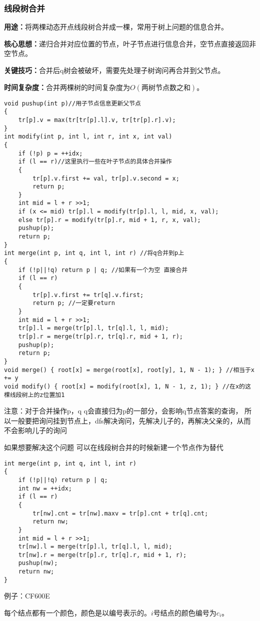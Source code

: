 \documentclass[a4paper, fontset=none]{ctexart}
\begin{document}
\subsubsection{线段树合并}
\textbf{用途：}将两棵动态开点线段树合并成一棵，常用于树上问题的信息合并。

\textbf{核心思想：}递归合并对应位置的节点，叶子节点进行信息合并，空节点直接返回非空节点。

\textbf{关键技巧：}合并后q树会被破坏，需要先处理子树询问再合并到父节点。

\textbf{时间复杂度：}合并两棵树的时间复杂度为$O(\text{两树节点数之和})$。
\begin{verbatim}
void pushup(int p)//用子节点信息更新父节点
{
    tr[p].v = max(tr[tr[p].l].v, tr[tr[p].r].v);
}
int modify(int p, int l, int r, int x, int val)
{
    if (!p) p = ++idx;
    if (l == r)//这里执行一些在叶子节点的具体合并操作
    {
        tr[p].v.first += val, tr[p].v.second = x;
        return p;
    }
    int mid = l + r >>1;
    if (x <= mid) tr[p].l = modify(tr[p].l, l, mid, x, val);
    else tr[p].r = modify(tr[p].r, mid + 1, r, x, val);
    pushup(p);
    return p;
}
int merge(int p, int q, int l, int r) //将q合并到p上
{
    if (!p||!q) return p | q; //如果有一个为空 直接合并
    if (l == r)
    {
        tr[p].v.first += tr[q].v.first;
        return p; //一定要return
    }
    int mid = l + r >>1;
    tr[p].l = merge(tr[p].l, tr[q].l, l, mid);
    tr[p].r = merge(tr[p].r, tr[q].r, mid + 1, r);
    pushup(p);
    return p;
}
void merge() { root[x] = merge(root[x], root[y], 1, N - 1); } //相当于x += y
void modify() { root[x] = modify(root[x], 1, N - 1, z, 1); } //在x的这棵线段树上的z位置加1
\end{verbatim}
注意：对于合并操作p，q \quad q会直接归为p的一部分，会影响q节点答案的查询，
所以一般要把询问挂到节点上，dfs解决询问，先解决儿子的，再解决父亲的，从而不会影响儿子的询问

如果想要解决这个问题 可以在线段树合并的时候新建一个节点作为替代
\begin{verbatim}
int merge(int p, int q, int l, int r)
{
    if (!p||!q) return p | q;
    int nw = ++idx;
    if (l == r)
    {
        tr[nw].cnt = tr[nw].maxv = tr[p].cnt + tr[q].cnt;
        return nw;
    }
    int mid = l + r >>1;
    tr[nw].l = merge(tr[p].l, tr[q].l, l, mid);
    tr[nw].r = merge(tr[p].r, tr[q].r, mid + 1, r);
    pushup(nw);
    return nw;
}
\end{verbatim}

例子：CF600E

每个结点都有一个颜色，颜色是以编号表示的。$i$号结点的颜色编号为$c_i$。
\end{document}
